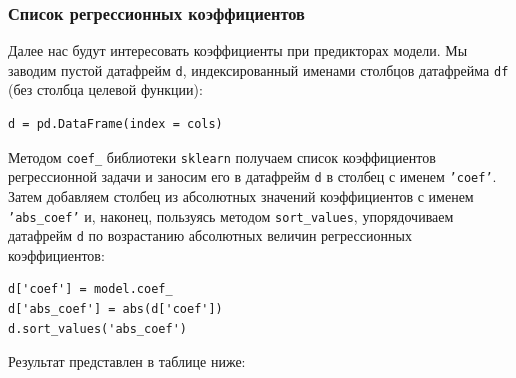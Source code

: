 \documentclass[a4paper,12pt]{article}
\begin{document}
\subsubsection{Список регрессионных коэффициентов}

Далее нас будут интересовать коэффициенты при предикторах модели. Мы заводим пустой датафрейм \texttt{d}, индексированный именами столбцов датафрейма \texttt{df}  (без столбца целевой функции): 
\begin{verbatim}
d = pd.DataFrame(index = cols)
\end{verbatim}
Методом \texttt{coef\_}  библиотеки \texttt{sklearn} получаем список коэффициентов регрессионной задачи и заносим его в датафрейм \texttt{d} в столбец с именем \texttt{'coef'}. Затем добавляем столбец из абсолютных значений коэффициентов с именем \texttt{'abs\_coef'} и, наконец, пользуясь методом \texttt{sort\_values}, упорядочиваем датафрейм \texttt{d} по возрастанию абсолютных величин регрессионных коэффициентов:
\begin{verbatim}
d['coef'] = model.coef_
d['abs_coef'] = abs(d['coef'])
d.sort_values('abs_coef')
\end{verbatim}
Результат представлен в таблице ниже:
\end{document}
